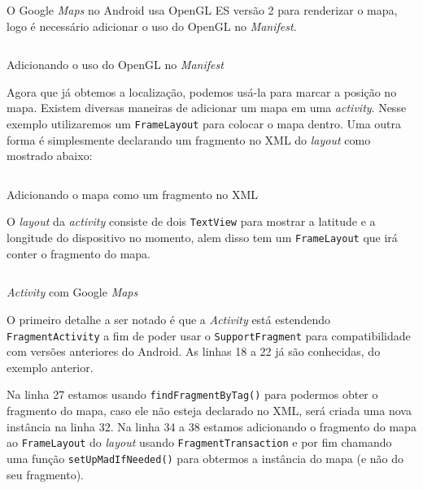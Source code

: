 \documentclass[a4paper,12pt,brazil,oneside]{book}
\begin{document}
\begin{singlespace}
		O Google \emph{Maps} no Android usa OpenGL ES versão 2 para renderizar o mapa, logo é necessário adicionar o uso do OpenGL no \emph{Manifest}.

		\begin{listing}[H]
		\inputminted[linenos=true,fontsize=\small,frame=lines, framesep=2mm, tabsize=2,numbersep=5pt]{xml}{src/api/maps/opengl.xml}
		\caption{Adicionando o uso do OpenGL no \emph{Manifest}}
		\label{code:mapfrag}
		\end{listing} 	

		Agora que já obtemos a localização, podemos usá-la para marcar a posição no mapa. Existem diversas maneiras de adicionar um mapa em uma \emph{activity}. Nesse exemplo utilizaremos um \texttt{FrameLayout} para colocar o mapa dentro. Uma outra forma é simplesmente declarando um fragmento no XML do \emph{layout} como mostrado abaixo:

		\begin{listing}[H]
		\inputminted[linenos=true,fontsize=\small,frame=lines, framesep=2mm, tabsize=2,numbersep=5pt]{xml}{src/api/maps/frag.xml}
		\caption{Adicionando o mapa como um fragmento no XML}
		\label{code:mapfrag2}
		\end{listing} 	
		
		O \emph{layout} da \emph{activity} consiste de dois \texttt{TextView} para mostrar a latitude e a longitude do dispositivo no momento, alem disso tem um \texttt{FrameLayout} que irá conter o fragmento do mapa.

		\begin{listing}[H]
		\inputminted[linenos=true,fontsize=\small,frame=lines, framesep=2mm, tabsize=2,numbersep=5pt]{java}{src/api/maps/activity.java}
		\caption{\emph{Activity} com Google \emph{Maps}}
		\label{code:mapactivity}
		\end{listing} 	
		
		O primeiro detalhe a ser notado é que a \emph{Activity} está estendendo \texttt{FragmentActivity} a fim de poder usar o \texttt{SupportFragment} para compatibilidade com versões anteriores do Android. As linhas 18 a 22 já são conhecidas, do exemplo anterior. 

		Na linha 27 estamos usando \texttt{findFragmentByTag()} para podermos obter o fragmento do mapa, caso ele não esteja declarado no XML, será criada uma nova instância na linha 32. Na linha 34 a 38 estamos adicionando o fragmento do mapa ao \texttt{FrameLayout} do \emph{layout} usando \texttt{FragmentTransaction} e por fim chamando uma função \texttt{setUpMadIfNeeded()} para obtermos a instância do mapa (e não do seu fragmento). 


\end{singlespace}
\end{document}
